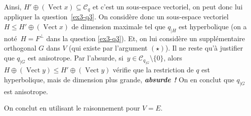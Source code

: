 \documentclass{../../td}
\begin{document}
\begin{enumerate}
\begin{itemize}
          Ainsi, $H' \oplus (\operatorname{Vect} x) \subseteq \mathcal{C}_q$ et c'est un sous-espace vectoriel, on peut donc lui appliquer la question~\ref{ex3-q3}.
          On considère donc  un sous-espace vectoriel $H \le H' \oplus (\operatorname{Vect} x)$ de dimension maximale tel que $q_{|H}$ est hyperbolique (on a noté~$H = F^\perp$ dans la question \ref{ex3-q3}).
          Et, on lui considère un supplémentaire orthogonal $G$ dans $V$ (qui existe par l'argument $(\star)$).
          Il ne reste qu'à justifier que $q_{|G}$ est anisotrope.
          Par l'absurde, si~$y \in \mathcal{C}_{q_{|G}} \setminus \{0\}$, alors $H \oplus (\operatorname{Vect} y) \le H' \oplus (\operatorname{Vect} y)$ vérifie que la restriction de $q$ est hyperbolique, mais de dimension plus grande, \textit{\textbf{absurde !}}
          On en conclut que $q_{|G}$ est anisotrope.
      \end{itemize}
      On conclut en utilisant le raisonnement pour $V = E$.
  \end{enumerate}

  \vfill

  \begin{center}
    \color{deepblue}
  \end{center}


  \vfill
\end{document}
